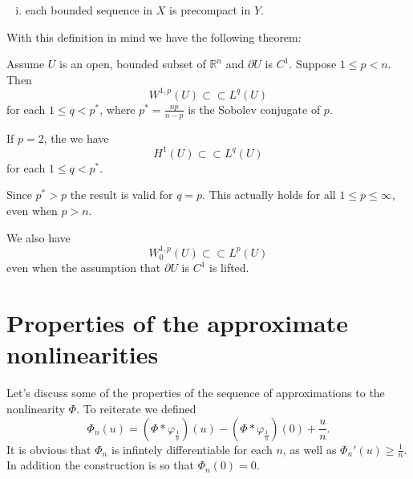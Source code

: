 \documentclass[11pt, a4paper]{article}
\begin{document}
\begin{appendix}
\begin{mydef}
\begin{enumerate}[i)]
	\item each bounded sequence in $X$ is precompact in $Y$.
\end{enumerate}
\end{mydef}

With this definition in mind we have the following theorem:
\begin{theorem}
\label{thm:Rellich}
Assume $U$ is an open, bounded subset of $\mathbb{R}^n$ and $\partial U$ is $C^1$.
Suppose $1\leq p < n$. Then
\begin{equation}
\label{Rellich}
W^{1,p}(U) \subset \subset L^q(U)
\end{equation}
for each $1\leq q < p^*$, where $p^* = \frac{np}{n-p}$ is the Sobolev conjugate of $p$.
\end{theorem}
\setcounter{rem}{0}
\begin{rem}
If $p=2$, the we have
\begin{equation*}
H^1(U) \subset \subset L^q(U)
\end{equation*}
for each $1\leq q < p^*$.
\end{rem}
\begin{rem}
Since $p^* > p$ the result is valid for $q=p$. This actually holds for all $1\leq p \leq \infty$, even when $p > n$.
\end{rem}
\begin{rem}
We also have 
\begin{equation*}
W^{1,p}_0(U) \subset \subset L^p(U)
\end{equation*}
even when the assumption that $\partial U$ is $C^1$ is lifted.
\end{rem}


\newpage
\section{Properties of the approximate nonlinearities}
\label{app:Phi}
Let's discuss some of the properties of the sequence of approximations to the nonlinearity $\Phi$. To reiterate we defined
\begin{equation*}
\Phi_n(u) = (\Phi * \varphi_{\frac{1}{n}})(u) - (\Phi * \varphi_{\frac{1}{n}})(0) + \frac{u}{n}.
\end{equation*}
It is obvious that $\Phi_n$ is infintely differentiable for each $n$, as well as $\Phi_n'(u) \geq \frac{1}{n}$. In addition the construction is so that $\Phi_n(0) = 0$.


\end{appendix}
\end{document}

